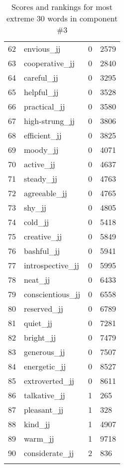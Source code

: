 \begin{longtable}[!htbp]{| rlr@{.}l |}
    62 & envious\_jj & 0 & 2579 \\
    63 & cooperative\_jj & 0 & 2840 \\
    64 & careful\_jj & 0 & 3295 \\
    65 & helpful\_jj & 0 & 3528 \\
    66 & practical\_jj & 0 & 3580 \\
    67 & high-strung\_jj & 0 & 3806 \\
    68 & efficient\_jj & 0 & 3825 \\
    69 & moody\_jj & 0 & 4071 \\
    70 & active\_jj & 0 & 4637 \\
    71 & steady\_jj & 0 & 4763 \\
    72 & agreeable\_jj & 0 & 4765 \\
    73 & shy\_jj & 0 & 4805 \\
    74 & cold\_jj & 0 & 5418 \\
    75 & creative\_jj & 0 & 5849 \\
    76 & bashful\_jj & 0 & 5941 \\
    77 & introspective\_jj & 0 & 5995 \\
    78 & neat\_jj & 0 & 6433 \\
    79 & conscientious\_jj & 0 & 6558 \\
    80 & reserved\_jj & 0 & 6789 \\
    81 & quiet\_jj & 0 & 7281 \\
    82 & bright\_jj & 0 & 7479 \\
    83 & generous\_jj & 0 & 7507 \\
    84 & energetic\_jj & 0 & 8527 \\
    85 & extroverted\_jj & 0 & 8611 \\
    86 & talkative\_jj & 1 & 265 \\
    87 & pleasant\_jj & 1 & 328 \\
    88 & kind\_jj & 1 & 4907 \\
    89 & warm\_jj & 1 & 9718 \\
    90 & considerate\_jj & 2 & 836 \\
    \hline
    \caption{Scores and rankings for most extreme 30 words in component \#3} \\
\end{longtable}
